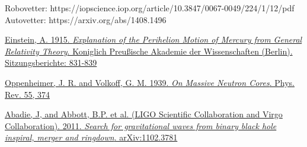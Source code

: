 
Robovetter: https://iopscience.iop.org/article/10.3847/0067-0049/224/1/12/pdf\\
Autovetter: https://arxiv.org/abs/1408.1496


\begin{thebibliography}{99}


 	\href{http://www.gsjournal.net/old/eeuro/vankov.pdf}{Einstein, A. 1915. \emph{Explanation of the
	Perihelion Motion of Mercury from General Relativity Theory}. Koniglich Preußische Akademie der Wissenschaften (Berlin). Sitzungsberichte: 831-839}
	
	\href{http://journals.aps.org/pr/abstract/10.1103/PhysRev.55.374}{Oppenheimer, J. R. and Volkoff, G. M. 1939. \emph{On Massive Neutron Cores}. Phys. Rev. 55, 374}
	
	\href{https://arxiv.org/pdf/1102.3781v1.pdf}{Abadie, J, and Abbott, B.P. et al. (LIGO Scientific Collaboration and Virgo 	Collaboration). 2011. \emph{Search for gravitational waves from binary black hole inspiral, merger and ringdown}.  		arXiv:1102.3781}

\end{thebibliography}